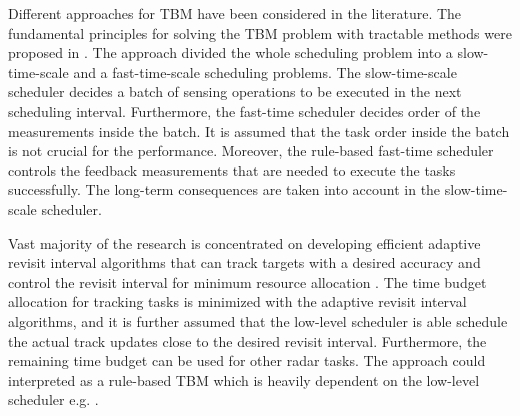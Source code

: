 \documentclass[11pt,a4paper]{article}
\begin{document}
Different approaches for TBM have been considered in the literature.
The fundamental principles for solving the TBM problem with tractable methods were proposed in \cite{Wintenby2006}.
The approach divided the whole scheduling problem into a slow-time-scale and a fast-time-scale scheduling problems.
The slow-time-scale scheduler decides a batch of sensing operations to be executed in the next scheduling interval.
Furthermore, the fast-time scheduler decides order of the measurements inside the batch.
It is assumed that the task order inside the batch is not crucial for the performance.
Moreover, the rule-based fast-time scheduler controls the feedback measurements that are needed to execute the tasks successfully.
The long-term consequences are taken into account in the slow-time-scale scheduler.

Vast majority of the research is concentrated on developing efficient adaptive revisit interval algorithms that can track targets with a desired accuracy and control the revisit interval for minimum resource allocation \cite{Keuk1975, Cohen1986, Gardner1988, Munu1992, vanKeuk1993, Watson1993, Daeipour1994, Shin1995, Benoudnine2006, ChengTing2007, Baek2010, Charlish2015, Mofrad2017, Masoumi-Ganjgah2017, Christiansen2018, Pilte2018}.
The time budget allocation for tracking tasks is minimized with the adaptive revisit interval algorithms, and it is further assumed that the low-level scheduler is able schedule the actual track updates close to the desired revisit interval.
Furthermore, the remaining time budget can be used for other radar tasks.
The approach could interpreted as a rule-based TBM which is heavily dependent on the low-level scheduler e.g. \cite{Shaghaghi2018}.
\end{document}
